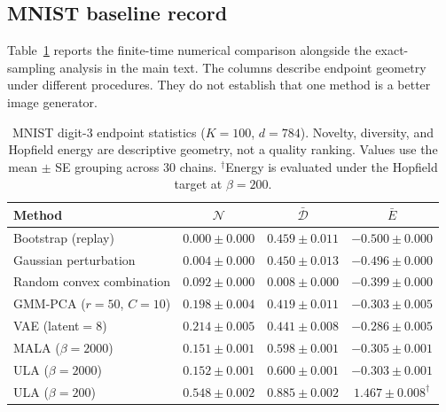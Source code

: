 \subsection{MNIST baseline record}
\label{app:mnist-baseline-record}
Table~\ref{tab:mnist-baselines} reports the finite-time numerical comparison
alongside the exact-sampling analysis in the main text. The columns describe
endpoint geometry under different procedures.
They do not establish that one method is a better image generator.
\begin{table}[t]
\centering
\caption{MNIST digit-3 endpoint statistics ($K=100$, $d=784$).
Novelty, diversity, and Hopfield energy are descriptive geometry, not a quality
ranking. Values use the mean $\pm$ SE grouping across 30 chains.
$^\dagger$Energy is evaluated under the Hopfield target at $\beta=200$.}
\label{tab:mnist-baselines}
\small
\begin{tabular}{@{}lccc@{}}
\toprule
Method & $\mathcal{N}$ & $\bar{\mathcal{D}}$ & $\bar{E}$ \\
\midrule
Bootstrap (replay)          & $0.000 \pm 0.000$ & $0.459 \pm 0.011$ & $-0.500 \pm 0.000$ \\
Gaussian perturbation       & $0.004 \pm 0.000$ & $0.450 \pm 0.013$ & $-0.496 \pm 0.000$ \\
Random convex combination   & $0.092 \pm 0.000$ & $0.008 \pm 0.000$ & $-0.399 \pm 0.000$ \\
GMM-PCA ($r{=}50$, $C{=}10$) & $0.198 \pm 0.004$ & $0.419 \pm 0.011$ & $-0.303 \pm 0.005$ \\
VAE (latent${=}8$)          & $0.214 \pm 0.005$ & $0.441 \pm 0.008$ & $-0.286 \pm 0.005$ \\
MALA ($\beta{=}2000$)       & $0.151 \pm 0.001$ & $0.598 \pm 0.001$ & $-0.305 \pm 0.001$ \\
ULA ($\beta{=}2000$) & $0.152 \pm 0.001$ & $0.600 \pm 0.001$ & $-0.303 \pm 0.001$ \\
ULA ($\beta{=}200$) & $0.548 \pm 0.002$ & $0.885 \pm 0.002$ & $1.467 \pm 0.008^\dagger$ \\
\bottomrule
\end{tabular}
\end{table}


